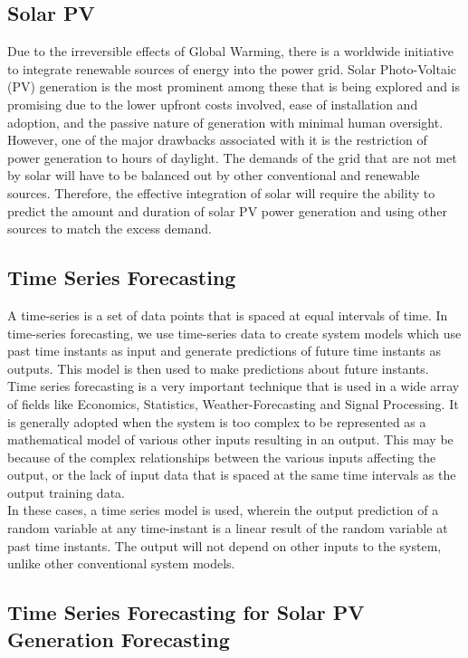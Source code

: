 \documentclass[journal]{IEEEtran}
\begin{document}
\subsection{Solar PV}
Due to the irreversible effects of Global Warming, there is a worldwide initiative to integrate renewable sources of energy into the power grid. Solar Photo-Voltaic (PV) generation is the most prominent among these that is being explored and is promising due to the lower upfront costs involved, ease of installation and adoption, and the passive nature of generation with minimal human oversight. However, one of the major drawbacks associated with it is the restriction of power generation to hours of daylight. The demands of the grid that are not met by solar will have to be balanced out by other conventional and renewable sources. Therefore, the effective integration of solar will require the ability to predict the amount and duration of solar PV power generation and using other sources to match the excess demand.

\subsection{Time Series Forecasting}

A time-series is a set of data points that is spaced at equal intervals of time. In time-series forecasting, we use time-series data to create system models which use past time instants as input and generate predictions of future time instants as outputs. This model is then used to make predictions about future instants.
\\
Time series forecasting is a very important technique that is used in a wide array of fields like Economics, Statistics, Weather-Forecasting and Signal Processing. It is generally adopted when the system is too complex to be represented as a mathematical model of various other inputs resulting in an output. This may be because of the complex relationships between the various inputs affecting the output, or the lack of input data that is spaced at the same time intervals as the output training data.
\\
In these cases, a time series model is used, wherein the output prediction of a random variable at any time-instant is a linear result of the random variable at past time instants. The output will not depend on other inputs to the system, unlike other conventional system models.


\subsection{Time Series Forecasting for Solar PV Generation Forecasting}
\end{document}
